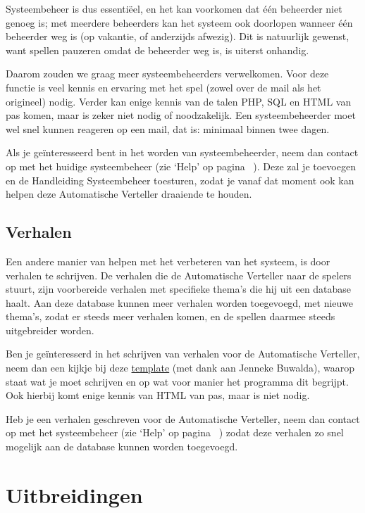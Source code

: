 \documentclass[12pt]{article}
\begin{document}
  Systeembeheer is dus essenti\"eel, en het kan voorkomen dat \'e\'en beheerder niet genoeg is; met meerdere beheerders kan het systeem ook doorlopen wanneer \'e\'en beheerder weg is (op vakantie, of anderzijds afwezig). Dit is natuurlijk gewenst, want spellen pauzeren omdat de beheerder weg is, is uiterst onhandig.  
  
  Daarom zouden we graag meer systeembeheerders verwelkomen. Voor deze functie is veel kennis en ervaring met het spel (zowel over de mail als het origineel) nodig. Verder kan enige kennis van de talen PHP, SQL en HTML van pas komen, maar is zeker niet nodig of noodzakelijk. Een systeembeheerder moet wel snel kunnen reageren op een mail, dat is: minimaal binnen twee dagen.
  
  Als je ge\"interesseerd bent in het worden van systeembeheerder, neem dan contact op met het huidige systeembeheer (zie `Help' op pagina~\pageref{subsec:help} ). Deze zal je toevoegen en de Handleiding Systeembeheer toesturen, zodat je vanaf dat moment ook kan helpen deze Automatische Verteller draaiende te houden.

  \subsection{Verhalen} \label{subsec:verhalen}
  
  Een andere manier van helpen met het verbeteren van het systeem, is door verhalen te schrijven. De verhalen die de Automatische Verteller naar de spelers stuurt, zijn voorbereide verhalen met specifieke thema's die hij uit een database haalt. Aan deze database kunnen meer verhalen worden toegevoegd, met nieuwe thema's, zodat er steeds meer verhalen komen, en de spellen daarmee steeds uitgebreider worden.
  
  Ben je ge\"interesserd in het schrijven van verhalen voor de Automatische Verteller, neem dan een kijkje bij deze \href{http://placeholder-voor-jennekes-template}{template} (met dank aan Jenneke Buwalda), waarop staat wat je moet schrijven en op wat voor manier het programma dit begrijpt. Ook hierbij komt enige kennis van HTML van pas, maar is niet nodig.
  
  Heb je een verhalen geschreven voor de Automatische Verteller, neem dan contact op met het systeembeheer (zie `Help' op pagina~\pageref{subsec:help} ) zodat deze verhalen zo snel mogelijk aan de database kunnen worden toegevoegd.
  
\section{Uitbreidingen}
\end{document}
